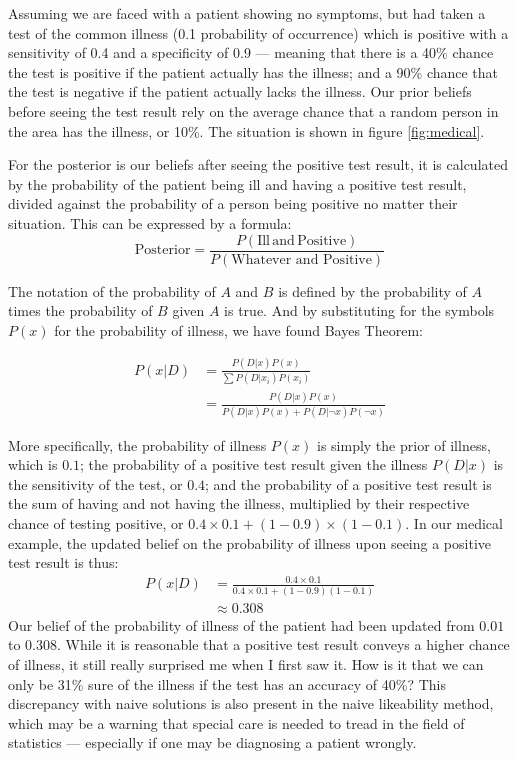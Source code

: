 \documentclass[a4paper,11pt]{article}
\begin{document}
Assuming we are faced with a patient showing no symptoms, but had taken a test of the common illness (0.1 probability of occurrence) which is positive with a sensitivity of 0.4 and a specificity of 0.9 --- meaning that there is a 40\% chance the test is positive if the patient actually has the illness; and a 90\% chance that the test is negative if the patient actually lacks the illness. Our prior beliefs before seeing the test result rely on the average chance that a random person in the area has the illness, or 10\%. The situation is shown in figure \ref{fig:medical}.

For the posterior is our beliefs after seeing the positive test result, it is calculated by the probability of the patient being ill and having a positive test result, divided against the probability of a person being positive no matter their situation. This can be expressed by a formula:
\[
    \text{Posterior} = \frac{P(\text{Ill} \,\text{and}\, \text{Positive})}{P(\text{Whatever and Positive})}
\]

The notation of the probability of $A$ and $B$ is defined by the probability of $A$ times the probability of $B$ given $A$ is true. And by substituting for the symbols $P(x)$ for the probability of illness, we have found Bayes Theorem:

\begin{align*}
    P(x|D) &= \frac{P(D|x) P(x)}{\sum P(D|x_i) P(x_i) }\\
     &= \frac{P(D|x)P(x)}{P(D|x)P(x) + P(D|\neg x)P(\neg x)}
\end{align*}

More specifically, the probability of illness $P(x)$ is simply the prior of illness, which is $0.1$; the probability of a positive test result given the illness $P(D|x)$ is the sensitivity of the test, or $0.4$; and the probability of a positive test result is the sum of having and not having the illness, multiplied by their respective chance of testing positive, or $0.4 \times 0.1 + (1- 0.9) \times (1-0.1)$. In our medical example, the updated belief on the probability of illness upon seeing a positive test result is thus:
\begin{align*}
    P(x|D) &= \frac{0.4 \times 0.1}{0.4 \times 0.1 + (1-0.9) (1-0.1)}\\
    &\approx 0.308
\end{align*}
Our belief of the probability of illness of the patient had been updated from $0.01$ to $0.308$. While it is reasonable that a positive test result conveys a higher chance of illness, it still really surprised me when I first saw it. How is it that we can only be 31\% sure of the illness if the test has an accuracy of 40\%? This discrepancy with naive solutions is also present in the naive likeability method, which may be a warning that special care is needed to tread in the field of statistics --- especially if one may be diagnosing a patient wrongly.
\end{document}

